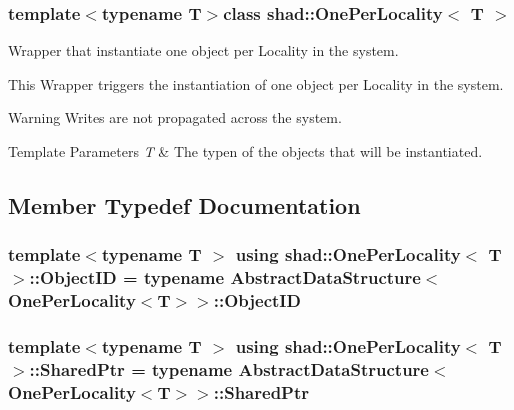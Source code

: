 \subsubsection*{template$<$typename T$>$class shad\-::\-One\-Per\-Locality$<$ T $>$}

Wrapper that instantiate one object per Locality in the system. 

This Wrapper triggers the instantiation of one object per Locality in the system.

\begin{DoxyWarning}{Warning}
Writes are not propagated across the system.
\end{DoxyWarning}

\begin{DoxyTemplParams}{Template Parameters}
{\em T} & The typen of the objects that will be instantiated. \\
\hline
\end{DoxyTemplParams}


\subsection{Member Typedef Documentation}
\hypertarget{classshad_1_1OnePerLocality_a60e8354048763662cb04eaab1b063977}{
\subsubsection[{Object\-I\-D}]{\setlength{\rightskip}{0pt plus 5cm}template$<$typename T $>$ using {\bf shad\-::\-One\-Per\-Locality}$<$ T $>$\-::{\bf Object\-I\-D} =  typename {\bf Abstract\-Data\-Structure}$<${\bf One\-Per\-Locality}$<$T$>$$>$\-::{\bf Object\-I\-D}}}\label{classshad_1_1OnePerLocality_a60e8354048763662cb04eaab1b063977}
\hypertarget{classshad_1_1OnePerLocality_ad3a4f471e9d1fe8998bf783553c92d52}{
\subsubsection[{Shared\-Ptr}]{\setlength{\rightskip}{0pt plus 5cm}template$<$typename T $>$ using {\bf shad\-::\-One\-Per\-Locality}$<$ T $>$\-::{\bf Shared\-Ptr} =  typename {\bf Abstract\-Data\-Structure}$<${\bf One\-Per\-Locality}$<$T$>$$>$\-::{\bf Shared\-Ptr}}}\label{classshad_1_1OnePerLocality_ad3a4f471e9d1fe8998bf783553c92d52}


